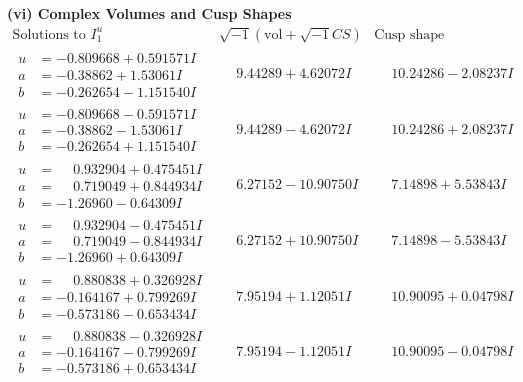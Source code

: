 \documentclass[1p]{elsarticle_modified}
\theoremstyle{definition}
\newcommand{\I}{\sqrt{-1}}
\begin{document}
\newpage\flushleft \textbf{(vi) Complex Volumes and Cusp Shapes}
$$\begin{array}{c|c|c}  
\text{Solutions to }I^u_{1}& \I (\text{vol} + \sqrt{-1}CS) & \text{Cusp shape}\\
 \hline 
\begin{aligned}
u &= -0.809668 + 0.591571 I \\
a &= -0.38862 + 1.53061 I \\
b &= -0.262654 - 1.151540 I\end{aligned}
 & \phantom{-}9.44289 + 4.62072 I & \phantom{-}10.24286 - 2.08237 I \\ \hline\begin{aligned}
u &= -0.809668 - 0.591571 I \\
a &= -0.38862 - 1.53061 I \\
b &= -0.262654 + 1.151540 I\end{aligned}
 & \phantom{-}9.44289 - 4.62072 I & \phantom{-}10.24286 + 2.08237 I \\ \hline\begin{aligned}
u &= \phantom{-}0.932904 + 0.475451 I \\
a &= \phantom{-}0.719049 + 0.844934 I \\
b &= -1.26960 - 0.64309 I\end{aligned}
 & \phantom{-}6.27152 - 10.90750 I & \phantom{-}7.14898 + 5.53843 I \\ \hline\begin{aligned}
u &= \phantom{-}0.932904 - 0.475451 I \\
a &= \phantom{-}0.719049 - 0.844934 I \\
b &= -1.26960 + 0.64309 I\end{aligned}
 & \phantom{-}6.27152 + 10.90750 I & \phantom{-}7.14898 - 5.53843 I \\ \hline\begin{aligned}
u &= \phantom{-}0.880838 + 0.326928 I \\
a &= -0.164167 + 0.799269 I \\
b &= -0.573186 - 0.653434 I\end{aligned}
 & \phantom{-}7.95194 + 1.12051 I & \phantom{-}10.90095 + 0.04798 I \\ \hline\begin{aligned}
u &= \phantom{-}0.880838 - 0.326928 I \\
a &= -0.164167 - 0.799269 I \\
b &= -0.573186 + 0.653434 I\end{aligned}
 & \phantom{-}7.95194 - 1.12051 I & \phantom{-}10.90095 - 0.04798 I \\ \hline\begin{aligned}

\end{aligned}
\end{array}$$
\end{document}
